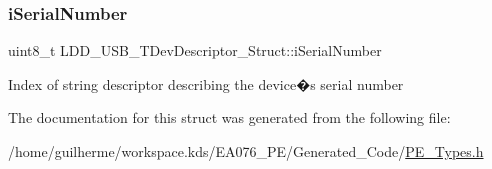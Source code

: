 \subsubsection{\texorpdfstring{i\+Serial\+Number}{iSerialNumber}}
{\footnotesize\ttfamily uint8\+\_\+t L\+D\+D\+\_\+\+U\+S\+B\+\_\+\+T\+Dev\+Descriptor\+\_\+\+Struct\+::i\+Serial\+Number}

Index of string descriptor describing the device�s serial number 

The documentation for this struct was generated from the following file\+:\begin{DoxyCompactItemize}
\item 
/home/guilherme/workspace.\+kds/\+E\+A076\+\_\+\+P\+E/\+Generated\+\_\+\+Code/\hyperlink{_p_e___types_8h}{P\+E\+\_\+\+Types.\+h}\end{DoxyCompactItemize}
